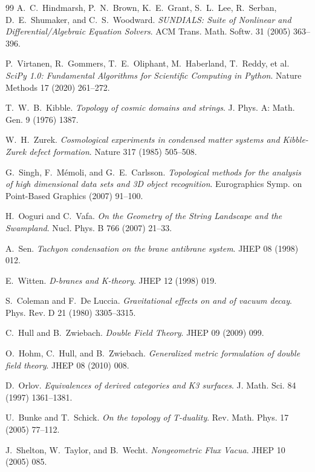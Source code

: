 \documentclass[11pt,a4paper]{article}
\begin{document}
\begin{thebibliography}{99}
A.~C.~Hindmarsh, P.~N.~Brown, K.~E.~Grant, S.~L.~Lee, R.~Serban, D.~E.~Shumaker, and C.~S.~Woodward.
\textit{SUNDIALS: Suite of Nonlinear and Differential/Algebraic Equation Solvers}.
ACM Trans. Math. Softw. 31 (2005) 363--396.

P.~Virtanen, R.~Gommers, T.~E.~Oliphant, M.~Haberland, T.~Reddy, et al.
\textit{SciPy 1.0: Fundamental Algorithms for Scientific Computing in Python}.
Nature Methods 17 (2020) 261--272.

T.~W.~B.~Kibble.
\textit{Topology of cosmic domains and strings}.
J. Phys. A: Math. Gen. 9 (1976) 1387.

W.~H.~Zurek.
\textit{Cosmological experiments in condensed matter systems and Kibble-Zurek defect formation}.
Nature 317 (1985) 505--508.

G.~Singh, F.~M{\'e}moli, and G.~E.~Carlsson.
\textit{Topological methods for the analysis of high dimensional data sets and 3D object recognition}.
Eurographics Symp. on Point-Based Graphics (2007) 91--100.

H.~Ooguri and C.~Vafa.
\textit{On the Geometry of the String Landscape and the Swampland}.
Nucl. Phys. B 766 (2007) 21--33.

A.~Sen.
\textit{Tachyon condensation on the brane antibrane system}.
JHEP 08 (1998) 012.

E.~Witten.
\textit{D-branes and K-theory}.
JHEP 12 (1998) 019.

S.~Coleman and F.~De Luccia.
\textit{Gravitational effects on and of vacuum decay}.
Phys. Rev. D 21 (1980) 3305--3315.

C.~Hull and B.~Zwiebach.
\textit{Double Field Theory}.
JHEP 09 (2009) 099.

O.~Hohm, C.~Hull, and B.~Zwiebach.
\textit{Generalized metric formulation of double field theory}.
JHEP 08 (2010) 008.

D.~Orlov.
\textit{Equivalences of derived categories and K3 surfaces}.
J. Math. Sci. 84 (1997) 1361--1381.

U.~Bunke and T.~Schick.
\textit{On the topology of T-duality}.
Rev. Math. Phys. 17 (2005) 77--112.

J.~Shelton, W.~Taylor, and B.~Wecht.
\textit{Nongeometric Flux Vacua}.
JHEP 10 (2005) 085.


\end{thebibliography}
\end{document}
